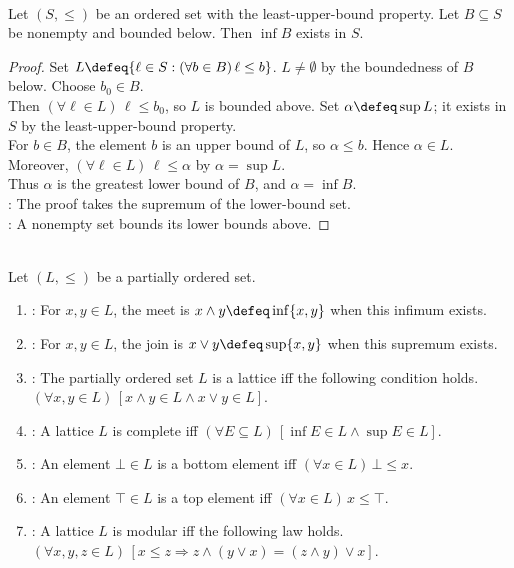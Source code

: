 \begin{theorem} \label{thm:lub-property-gives-glb-property} \\
Let $(S,\leq)$ be an ordered set with the least-upper-bound property. Let $B\subseteq S$ be nonempty and bounded below. Then $\inf B$ exists in $S$.
\begin{proof} Set $L\defeq\{\ell\in S:(\forall b\in B)\,\ell\leq b\}$. $L\neq\emptyset$ by the boundedness of $B$ below. Choose $b_0\in B$.\\
Then $(\forall \ell\in L)\,\ell\leq b_0$, so $L$ is bounded above. Set $\alpha\defeq\sup L$; it exists in $S$ by the least-upper-bound property.\\
For $b\in B$, the element $b$ is an upper bound of $L$, so $\alpha\leq b$. Hence $\alpha\in L$. Moreover, $(\forall \ell\in L)\,\ell\leq\alpha$ by $\alpha=\sup L$.\\
Thus $\alpha$ is the greatest lower bound of $B$, and $\alpha=\inf B$.\\
: The proof takes the supremum of the lower-bound set.\\
: A nonempty set bounds its lower bounds above.
\end{proof}
\end{theorem}

\begin{definition} \label{def:lattice-vocabulary} \\
Let $(L,\leq)$ be a partially ordered set.
\begin{enumerate}[label=(\roman*)]
\setlength{\itemsep}{0pt}
\item {}: For $x,y\in L$, the meet is $x\wedge y\defeq\inf\{x,y\}$ when this infimum exists.
\item {}: For $x,y\in L$, the join is $x\vee y\defeq\sup\{x,y\}$ when this supremum exists.
\item {}: The partially ordered set $L$ is a lattice iff the following condition holds. $(\forall x,y\in L)\,[x\wedge y\in L\land x\vee y\in L]$.
\item {}: A lattice $L$ is complete iff $(\forall E\subseteq L)\,[\inf E\in L\land\sup E\in L]$.
\item {}: An element $\bot\in L$ is a bottom element iff $(\forall x\in L)\,\bot\leq x$.
\item {}: An element $\top\in L$ is a top element iff $(\forall x\in L)\,x\leq\top$.
\item {}: A lattice $L$ is modular iff the following law holds. $(\forall x,y,z\in L)\,[x\leq z\Rightarrow z\wedge(y\vee x)=(z\wedge y)\vee x]$.
\end{enumerate}
\end{definition}
